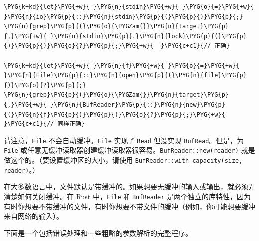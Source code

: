 \begin{Verbatim}[commandchars=\\\{\},breaklines=true,breakanywhere=true,fontsize=\codefont,xleftmargin=17bp]
\PYG{k+kd}{let}\PYG{+w}{ }\PYG{n}{stdin}\PYG{+w}{ }\PYG{o}{=}\PYG{+w}{ }\PYG{n}{io}\PYG{p}{::}\PYG{n}{stdin}\PYG{p}{(}\PYG{p}{)}\PYG{p}{;}
\PYG{n}{grep}\PYG{p}{(}\PYG{o}{\PYGZam{}}\PYG{n}{target}\PYG{p}{,}\PYG{+w}{ }\PYG{n}{stdin}\PYG{p}{.}\PYG{n}{lock}\PYG{p}{(}\PYG{p}{)}\PYG{p}{)}\PYG{o}{?}\PYG{p}{;}\PYG{+w}{  }\PYG{c+c1}{// 正确}

\PYG{k+kd}{let}\PYG{+w}{ }\PYG{n}{f}\PYG{+w}{ }\PYG{o}{=}\PYG{+w}{ }\PYG{n}{File}\PYG{p}{::}\PYG{n}{open}\PYG{p}{(}\PYG{n}{file}\PYG{p}{)}\PYG{o}{?}\PYG{p}{;}
\PYG{n}{grep}\PYG{p}{(}\PYG{o}{\PYGZam{}}\PYG{n}{target}\PYG{p}{,}\PYG{+w}{ }\PYG{n}{BufReader}\PYG{p}{::}\PYG{n}{new}\PYG{p}{(}\PYG{n}{f}\PYG{p}{)}\PYG{p}{)}\PYG{o}{?}\PYG{p}{;}\PYG{+w}{  }\PYG{c+c1}{// 同样正确}
\end{Verbatim}

请注意，\texttt{File} 不会自动缓冲。\texttt{File} 实现了 \texttt{Read} 但没实现 \texttt{BufRead}。但是，为 \texttt{File} 或任意无缓冲读取器创建缓冲读取器很容易。\texttt{BufReader::new(reader)} 就是做这个的。（要设置缓冲区的大小，请使用 \texttt{BufReader::with\_capacity(size, reader)}。）

在大多数语言中，文件默认是带缓冲的。如果想要无缓冲的输入或输出，就必须弄清楚如何关闭缓冲。在 Rust 中，\texttt{File} 和 \texttt{BufReader} 是两个独立的库特性，因为有时你想要不带缓冲的文件，有时你想要不带文件的缓冲（例如，你可能想要缓冲来自网络的输入）。

下面是一个包括错误处理和一些粗略的参数解析的完整程序。

